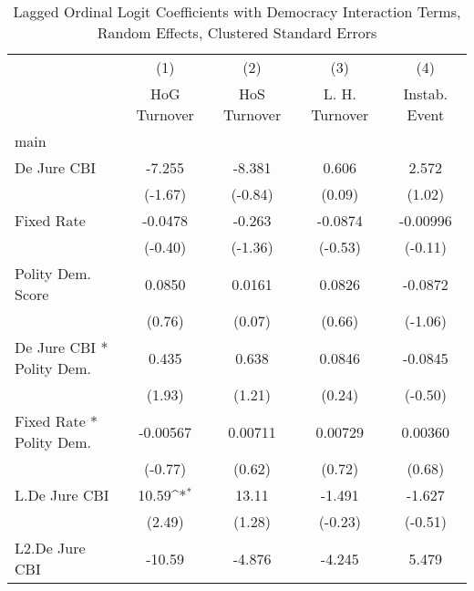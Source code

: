 {
\def\sym#1{\ifmmode^{#1}\else\(^{#1}\)\fi}
\begin{longtable}{l*{4}{c}}
\caption{Lagged Ordinal Logit Coefficients with Democracy Interaction Terms, Random Effects, Clustered Standard Errors \label{demintlagordLogLogDJ}}\\
\hline\hline\endfirsthead\hline\endhead\hline\endfoot\endlastfoot
                &\multicolumn{1}{c}{(1)}&\multicolumn{1}{c}{(2)}&\multicolumn{1}{c}{(3)}&\multicolumn{1}{c}{(4)}\\
                &\multicolumn{1}{c}{HoG Turnover}&\multicolumn{1}{c}{HoS Turnover}&\multicolumn{1}{c}{L. H. Turnover}&\multicolumn{1}{c}{Instab. Event}\\
\hline
main            &                  &                  &                  &                  \\
De Jure CBI     &   -7.255         &   -8.381         &    0.606         &    2.572         \\
                &  (-1.67)         &  (-0.84)         &   (0.09)         &   (1.02)         \\
[1em]
Fixed Rate      &  -0.0478         &   -0.263         &  -0.0874         & -0.00996         \\
                &  (-0.40)         &  (-1.36)         &  (-0.53)         &  (-0.11)         \\
[1em]
Polity Dem. Score&   0.0850         &   0.0161         &   0.0826         &  -0.0872         \\
                &   (0.76)         &   (0.07)         &   (0.66)         &  (-1.06)         \\
[1em]
De Jure CBI * Polity Dem.&    0.435         &    0.638         &   0.0846         &  -0.0845         \\
                &   (1.93)         &   (1.21)         &   (0.24)         &  (-0.50)         \\
[1em]
Fixed Rate * Polity Dem.& -0.00567         &  0.00711         &  0.00729         &  0.00360         \\
                &  (-0.77)         &   (0.62)         &   (0.72)         &   (0.68)         \\
[1em]
L.De Jure CBI   &    10.59\sym{*}  &    13.11         &   -1.491         &   -1.627         \\
                &   (2.49)         &   (1.28)         &  (-0.23)         &  (-0.51)         \\
[1em]
L2.De Jure CBI  &   -10.59         &   -4.876         &   -4.245         &    5.479         \\

\end{longtable}}
